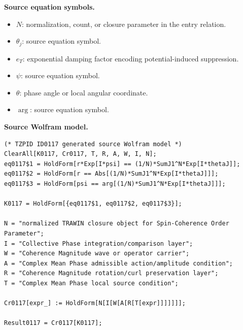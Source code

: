 \begin{minipage}[t]{0.49\linewidth}
\begingroup
\small
\raggedright
\textbf{Source equation symbols.}\par
\begin{itemize}[leftmargin=1.35em,itemsep=1pt,topsep=1pt,parsep=0pt]
    \item $N$: normalization, count, or closure parameter in the entry relation.
    \item $\theta_j$: source equation symbol.
    \item $e_T$: exponential damping factor encoding potential-induced suppression.
    \item $\psi$: source equation symbol.
    \item $\theta$: phase angle or local angular coordinate.
    \item $\arg$: source equation symbol.
\end{itemize}
\endgroup
\end{minipage}\hfill
\begin{minipage}[t]{0.47\linewidth}
\begingroup
\scriptsize
\raggedright
\textbf{Source Wolfram model.}\par
\begin{Verbatim}[fontsize=\tiny,breaklines=true,breakanywhere=true]
(* TZPID ID0117 generated source Wolfram model *)
ClearAll[K0117, Cr0117, T, R, A, W, I, N];
eq0117$1 = HoldForm[r*Exp[I*psi] == (1/N)*SumJ1^N*Exp[I*thetaJ]];
eq0117$2 = HoldForm[r == Abs[(1/N)*SumJ1^N*Exp[I*thetaJ]]];
eq0117$3 = HoldForm[psi == arg[(1/N)*SumJ1^N*Exp[I*thetaJ]]];

K0117 = HoldForm[{eq0117$1, eq0117$2, eq0117$3}];

N = "normalized TRAWIN closure object for Spin-Coherence Order Parameter";
I = "Collective Phase integration/comparison layer";
W = "Coherence Magnitude wave or operator carrier";
A = "Complex Mean Phase admissible action/amplitude condition";
R = "Coherence Magnitude rotation/curl preservation layer";
T = "Complex Mean Phase local source condition";

Cr0117[expr_] := HoldForm[N[I[W[A[R[T[expr]]]]]]];

Result0117 = Cr0117[K0117];
\end{Verbatim}
\endgroup
\end{minipage}

